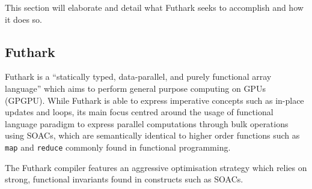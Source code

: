 \documentclass[11pt,bibliography=totocnumbered]{article}
\begin{document}
This section will elaborate and detail what Futhark seeks to accomplish and how it does so.



\subsection{Futhark}

Futhark is a ``statically typed, data-parallel, and purely functional array language'' \cite{futharklang} which aims to perform
 general purpose computing on GPUs (GPGPU). While Futhark is able to express imperative concepts such as in-place updates and loops, its main focus centred around the usage of
 functional language paradigm to express parallel computations through bulk operations using SOACs, which are semantically identical to higher order functions such as \texttt{map} and \texttt{reduce} commonly found in functional programming.

The Futhark compiler features an aggressive optimisation strategy which relies on strong, functional invariants found in constructs such as SOACs.

\end{document}
